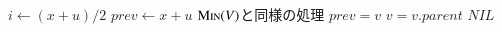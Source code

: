 \documentclass[main]{subfiles}
\begin{document}
\begin{algorithm}[H]
\caption{$\Successor(V,x)$}
\begin{algorithmic}[1]
\scriptsize
{}
	\State $i \gets (x + u)/2$
	\State $prev \gets x + u$
		\State $\mathrm{\text{M\textsc{in}}}(V)$と同様の処理
		\Else
			\State $prev = v$
			\State $v = v.parent$
		\EndIf
	\EndWhile
	\State \Return $NIL$
\EndFunction
\end{algorithmic}
\end{algorithm}
\end{document}
